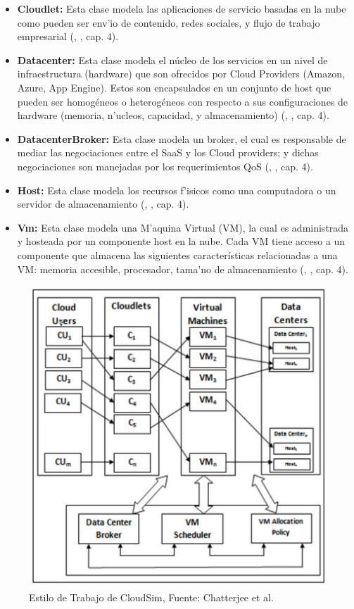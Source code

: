 \begin{itemize}
	\item  \textbf{Cloudlet:} Esta clase modela las aplicaciones de servicio basadas en la nube como pueden ser env'io de contenido, redes sociales, y flujo de trabajo empresarial (\citeauthor{calheiros2011cloudsim}, \citeyear{calheiros2011cloudsim}, cap. 4).
	\item  \textbf{Datacenter:} Esta clase modela el núcleo de los servicios en un nivel de infraestructura (hardware) que son ofrecidos por Cloud Providers (Amazon, Azure, App Engine). Estos son encapsulados en un conjunto de host que pueden ser homogéneos o heterogéneos con respecto a sus configuraciones de hardware (memoria, n'ucleos, capacidad, y almacenamiento) (\citeauthor{calheiros2011cloudsim}, \citeyear{calheiros2011cloudsim}, cap. 4).
	\item  \textbf{DatacenterBroker:} Esta clase modela un broker, el cual es responsable de mediar las negociaciones entre el SaaS y los Cloud providers; y dichas negociaciones son manejadas por los requerimientos QoS (\citeauthor{calheiros2011cloudsim}, \citeyear{calheiros2011cloudsim}, cap. 4).
	\item  \textbf{Host:} Esta clase modela los recursos f'isicos como una computadora o un servidor de almacenamiento (\citeauthor{calheiros2011cloudsim}, \citeyear{calheiros2011cloudsim}, cap. 4).
	\item  \textbf{Vm:} Esta clase modela una M'aquina Virtual (VM), la cual es administrada y hosteada por un componente host en la nube. Cada VM tiene acceso a un componente que almacena las siguientes características relacionadas a una VM: memoria accesible, procesador, tama'no de almacenamiento (\citeauthor{calheiros2011cloudsim}, \citeyear{calheiros2011cloudsim}, cap. 4).
\end{itemize}



\begin{figure}
	\caption{Estilo de Trabajo de CloudSim, Fuente: Chatterjee et al.}
	\centering
	\includegraphics[scale=0.5]{media/imagenuno}
\end{figure}


